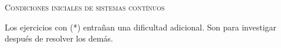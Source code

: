 \documentclass[11pt, spanish, a4paper, twopage]{article}
\begin{document}
\begin{center}
	\textsc{\LARGE Condiciones iniciales de sistemas contínuos}
\end{center}


Los ejercicios con (*) entrañan una dificultad adicional. Son para investigar después de resolver los demás.


\begin{enumerate}

}

}

}

\end{enumerate}
\end{document}
